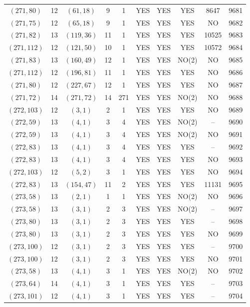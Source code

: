 \begin{longtable}{|c|c|c|c|c|c|c|c|c|c|}
$(271, 80)$ & 12 & $(61, 18)$ & 9 & 1 & YES & YES & YES & 8647 & 9681\\
$(271, 75)$ & 12 & $(65, 18)$ & 9 & 1 & YES & YES & YES & NO & 9682\\
$(271, 82)$ & 13 & $(119, 36)$ & 11 & 1 & YES & YES & YES & 10525 & 9683\\
$(271, 112)$ & 12 & $(121, 50)$ & 10 & 1 & YES & YES & YES & 10572 & 9684\\
$(271, 83)$ & 13 & $(160, 49)$ & 12 & 1 & YES & YES & NO(2) & NO & 9685\\
$(271, 112)$ & 12 & $(196, 81)$ & 11 & 1 & YES & YES & YES & NO & 9686\\
$(271, 80)$ & 12 & $(227, 67)$ & 12 & 1 & YES & YES & YES & NO & 9687\\
$(271, 72)$ & 14 & $(271, 72)$ & 14 & 271 & YES & YES & NO(2) & NO & 9688\\
$(272, 103)$ & 12 & $(3, 1)$ & 2 & 1 & YES & YES & YES & NO & 9689\\
$(272, 59)$ & 13 & $(4, 1)$ & 3 & 4 & YES & YES & NO(2) & -- & 9690\\
$(272, 59)$ & 13 & $(4, 1)$ & 3 & 4 & YES & YES & NO(2) & NO & 9691\\
$(272, 83)$ & 13 & $(4, 1)$ & 3 & 4 & YES & YES & YES & -- & 9692\\
$(272, 83)$ & 13 & $(4, 1)$ & 3 & 4 & YES & YES & YES & NO & 9693\\
$(272, 103)$ & 12 & $(5, 2)$ & 3 & 1 & YES & YES & YES & NO & 9694\\
$(272, 83)$ & 13 & $(154, 47)$ & 11 & 2 & YES & YES & YES & 11131 & 9695\\
$(273, 58)$ & 13 & $(2, 1)$ & 1 & 1 & YES & YES & NO(2) & NO & 9696\\
$(273, 58)$ & 13 & $(3, 1)$ & 2 & 3 & YES & YES & NO(2) & -- & 9697\\
$(273, 80)$ & 13 & $(3, 1)$ & 2 & 3 & YES & YES & YES & -- & 9698\\
$(273, 80)$ & 13 & $(3, 1)$ & 2 & 3 & YES & YES & YES & NO & 9699\\
$(273, 100)$ & 12 & $(3, 1)$ & 2 & 3 & YES & YES & YES & -- & 9700\\
$(273, 100)$ & 12 & $(3, 1)$ & 2 & 3 & YES & YES & YES & NO & 9701\\
$(273, 58)$ & 13 & $(4, 1)$ & 3 & 1 & YES & YES & NO(2) & NO & 9702\\
$(273, 64)$ & 14 & $(4, 1)$ & 3 & 1 & YES & YES & YES & -- & 9703\\
$(273, 101)$ & 12 & $(4, 1)$ & 3 & 1 & YES & YES & YES & -- & 9704\\

\end{longtable}
